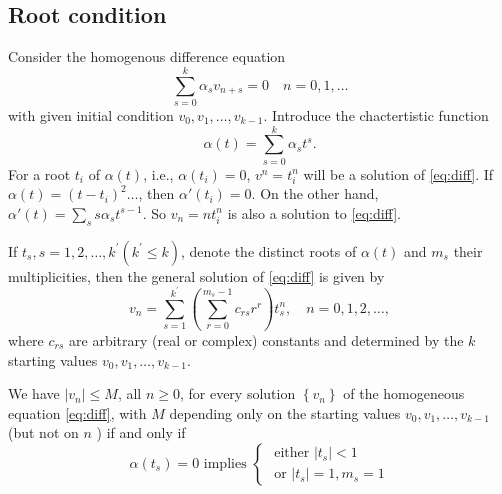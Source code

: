 \documentclass[10pt]{amsart}
\begin{document}
\subsection{Root condition}
Consider the homogenous difference equation
\begin{equation}\label{eq:diff}
\sum_{s=0}^k \alpha_s v_{n+s} = 0\quad n = 0, 1, \ldots
\end{equation}
with given initial condition $v_0, v_1, \ldots, v_{k-1}$. Introduce the chactertistic function
$$
\alpha (t) = \sum_{s=0}^k \alpha_s t^s. 
$$
For a root $t_i$ of $\alpha(t)$, i.e., $\alpha(t_i) = 0$, $v^n = t_i^n$ will be a solution of \eqref{eq:diff}. If $\alpha(t) = (t-t_i)^2\ldots $, then $\alpha'(t_i) = 0$. On the other hand, $\alpha'(t) = \sum_s s \alpha_s t^{s-1}$. So $v_n = nt_i^n$ is also a solution to \eqref{eq:diff}. 

If $t_s, s=1,2, \ldots, k^{\prime}\left(k^{\prime} \leq k\right)$, denote the distinct roots of $\alpha(t)$ and $m_s$ their multiplicities, then the general solution of \eqref{eq:diff} is given by
$$
v_n=\sum_{s=1}^{k^{\prime}}\left(\sum_{r=0}^{m_s-1} c_{r s} r^r\right) t_s^n, \quad n=0,1,2, \ldots,
$$
where $c_{r s}$ are arbitrary (real or complex) constants and determined by the $k$ starting values $v_0, v_1, \ldots, v_{k-1}$.

\begin{theorem}
We have $\left|v_n\right| \leq M$, all $n \geq 0$, for every solution $\left\{v_n\right\}$ of the homogeneous equation \eqref{eq:diff}, with $M$ depending only on the starting values $v_0, v_1, \ldots, v_{k-1}$ (but not on $n$ ) if and only if
$$
\alpha\left(t_s\right)=0 \text { implies }\left\{\begin{array}{l}
\text { either }\left|t_s\right|<1 \\
\text { or }\left|t_s\right|=1, m_s=1
\end{array}\right.
$$
\end{theorem}
\end{document}

